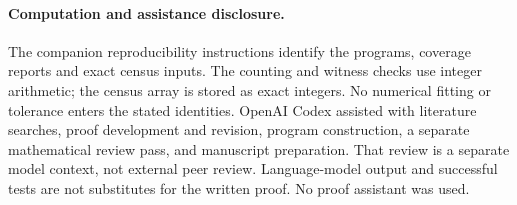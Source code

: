 \documentclass[11pt,a4paper]{article}
\theoremstyle{remark}
\begin{document}
\paragraph{Computation and assistance disclosure.}
The companion reproducibility instructions identify the programs,
coverage reports and exact census inputs. The counting and witness
checks use integer arithmetic; the census array is stored as exact
integers. No numerical fitting or tolerance enters the stated identities.
OpenAI Codex assisted with literature searches, proof development and
revision, program construction, a separate mathematical review pass,
and manuscript preparation. That review is a separate model context,
not external peer review. Language-model output and successful tests
are not substitutes for the written proof. No proof assistant was used.



\end{document}
